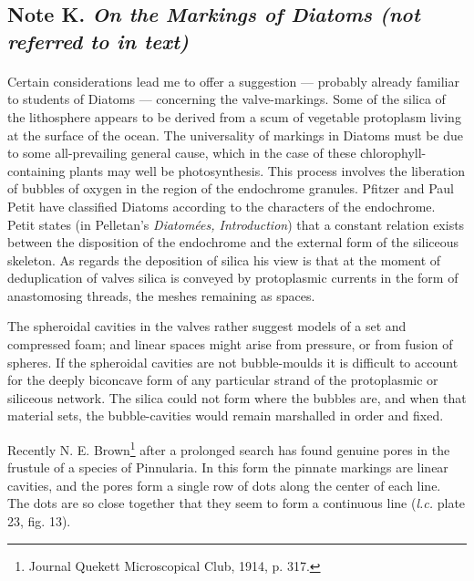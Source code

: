\documentclass[a4paper, 12pt, oneside]{article}
\begin{document}
\subsection{Note K. \emph{On the Markings of Diatoms (not referred to in text)}}
\paragraph{}
Certain considerations lead me to offer a suggestion --- probably already familiar to students of Diatoms --- concerning the valve-markings. Some of the silica of the lithosphere appears to be derived from a scum of vegetable protoplasm living at the surface of the ocean. The universality of markings in Diatoms must be due to some all-prevailing general cause, which in the case of these chlorophyll-containing plants may well be photosynthesis. This process involves the liberation of bubbles of oxygen in the region of the endochrome granules. Pfitzer and Paul Petit have classified Diatoms according to the characters of the endochrome. Petit states (in Pelletan's \emph{Diatomées, Introduction}) that a constant relation exists between the disposition of the endochrome and the external form of the siliceous skeleton. As regards the deposition of silica his view is that at the moment of deduplication of valves silica is conveyed by protoplasmic currents in the form of anastomosing threads, the meshes remaining as spaces.

The spheroidal cavities in the valves rather suggest models of a set and compressed foam; and linear spaces might arise from pressure, or from fusion of spheres. If the spheroidal cavities are not bubble-moulds it is difficult to account for the deeply biconcave form of any particular strand of the protoplasmic or siliceous network. The silica could not form where the bubbles are, and when that material sets, the bubble-cavities would remain marshalled in order and fixed.

Recently N. E. Brown\footnote{Journal Quekett Microscopical Club, 1914, p. 317.} after a prolonged search has found genuine pores in the frustule of a species of Pinnularia. In this form the pinnate markings are linear cavities, and the pores form a single row of dots along the center of each line. The dots are so close together that they seem to form a continuous line (\emph{l.c.} plate 23, fig. 13).
\end{document}
